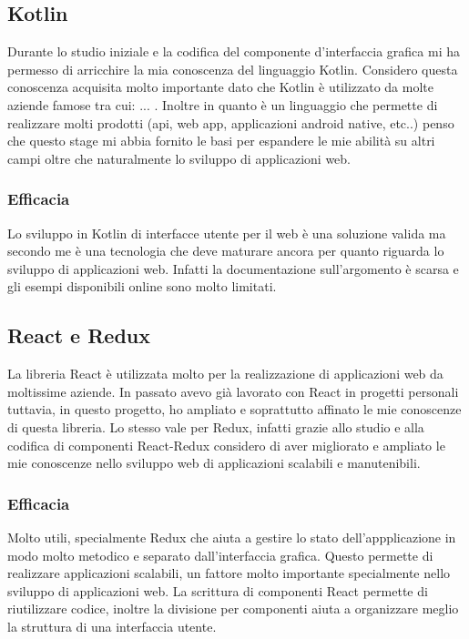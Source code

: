 \subsection{Kotlin}
Durante lo studio iniziale e la codifica del componente d'interfaccia grafica mi ha permesso di arricchire la mia conoscenza del linguaggio Kotlin. Considero questa conoscenza acquisita molto importante dato che Kotlin è utilizzato da molte aziende famose tra cui: ... . Inoltre in quanto è un linguaggio che permette di realizzare molti prodotti (api, web app, applicazioni android native, etc..) penso che questo stage mi abbia fornito le basi per espandere le mie abilità su altri campi oltre che naturalmente lo sviluppo di applicazioni web.

\subsubsection*{Efficacia}
Lo sviluppo in Kotlin di interfacce utente per il web è una soluzione valida ma secondo me è una tecnologia che deve maturare ancora per quanto riguarda lo sviluppo di applicazioni web. Infatti la documentazione sull'argomento è scarsa e gli esempi disponibili online sono molto limitati.

\subsection{React e Redux}
La libreria React è utilizzata molto per la realizzazione di applicazioni web da moltissime aziende. In passato avevo già lavorato con React in progetti personali tuttavia, in questo progetto, ho ampliato e soprattutto affinato le mie conoscenze di questa libreria. Lo stesso vale per Redux, infatti grazie allo studio e alla codifica di componenti React-Redux considero di aver migliorato e ampliato le mie conoscenze nello sviluppo web di applicazioni scalabili e manutenibili.

\subsubsection*{Efficacia}
Molto utili, specialmente Redux che aiuta a gestire lo stato dell'appplicazione in modo molto metodico e separato dall'interfaccia grafica. Questo permette di realizzare applicazioni scalabili, un fattore molto importante specialmente nello sviluppo di applicazioni web. La scrittura di componenti React permette di riutilizzare codice, inoltre la divisione per componenti aiuta a organizzare meglio la struttura di una interfaccia utente. 

